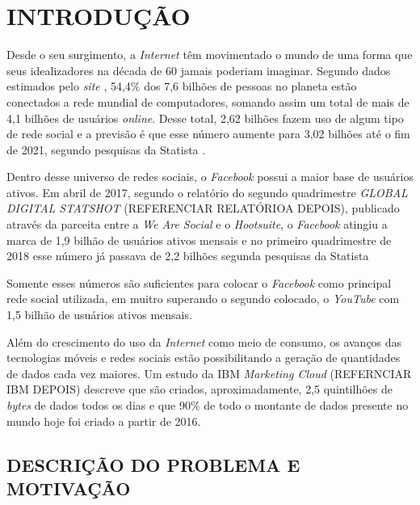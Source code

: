 
%

\chapter{INTRODUÇÃO}
\label{chap:introducao}

Desde o seu surgimento, a \textit{Internet} têm movimentado o mundo de uma forma que seus idealizadores na década de 60 jamais poderiam imaginar. Segundo dados estimados pelo \textit{site} , 54,4\% dos 7,6 bilhões de pessoas no planeta estão conectados a rede mundial de computadores, somando assim um total de mais de 4,1 bilhões de usuários \textit{online}. Desse total, 2,62 bilhões fazem uso de algum tipo de rede social e a previsão é que esse número aumente para 3,02 bilhões até o fim de 2021, segundo pesquisas da Statista .

Dentro desse universo de redes sociais, o \textit{Facebook} possui a maior base de usuários ativos. Em abril de 2017, segundo o relatório do segundo quadrimestre \textit{GLOBAL DIGITAL STATSHOT} (REFERENCIAR RELATÓRIOA DEPOIS), publicado através da parceita entre a \textit{We Are Social} e o \textit{Hootsuite}, o \textit{Facebook} atingiu a marca de 1,9 bilhão de usuários ativos mensais e no primeiro quadrimestre de 2018 esse número já passava de 2,2 bilhões segunda pesquisas da Statista 

Somente esses números são suficientes para colocar o \textit{Facebook} como principal rede social utilizada, em muitro superando o segundo colocado, o \textit{YouTube} com 1,5 bilhão de usuários ativos mensais. 

Além do crescimento do uso da \textit{Internet} como meio de consumo, os avanços das tecnologias móveis e redes sociais estão possibilitando a geração de quantidades de dados cada vez maiores. Um estudo da IBM \textit{Marketing Cloud} (REFERNCIAR IBM DEPOIS) descreve que são criados, aproximadamente, 2,5 quintilhões de \textit{bytes} de dados todos os dias e que 90\% de todo o montante de dados presente no mundo hoje foi criado a partir de 2016.

\section{DESCRIÇÃO DO PROBLEMA E MOTIVAÇÃO}
\label{sec:descricaomotivacao}

